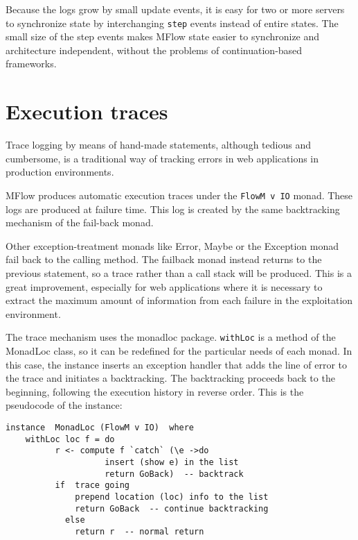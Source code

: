 \documentclass{tmr}
\begin{document}
Because the logs grow by small update events, it is easy for two or more servers to synchronize state by interchanging {\tt step} events instead of entire states. The small size of the step events  makes MFlow state easier to synchronize and architecture independent, without the problems of continuation-based frameworks. 
 
\section{Execution traces} 
 
Trace logging by means of hand-made statements, although tedious and cumbersome, is a traditional way of tracking errors in web applications in production environments.
 
MFlow produces automatic execution traces under the {\tt FlowM v IO} 
monad. These logs are produced at failure time. This log is created by the same backtracking mechanism of the fail-back monad.

Other exception-treatment monads like Error, Maybe or the Exception monad  fail back to the calling method. The failback monad instead returns to the previous statement, so  a trace rather than a call stack will be produced. This is a great improvement, especially for web applications where it is necessary to extract the maximum amount of information from each failure in the exploitation environment. 

The trace mechanism uses the monadloc\cite{auth:monadloc} package. {\tt withLoc} is a method of the MonadLoc class, so it can be redefined for the particular needs of each monad. In this case, the instance inserts an exception handler that adds the line of error to the trace and initiates a backtracking. The backtracking proceeds back to the beginning, following the execution history in reverse order.  This is the pseudocode of the instance: 
 
{\tt

\begin{verbatim}
instance  MonadLoc (FlowM v IO)  where 
    withLoc loc f = do 
          r <- compute f `catch` (\e ->do 
                    insert (show e) in the list 
                    return GoBack)  -- backtrack 
          if  trace going 
              prepend location (loc) info to the list 
              return GoBack  -- continue backtracking 
            else 
              return r  -- normal return 
 
 \end{verbatim}
 
 }
 
\end{document}
